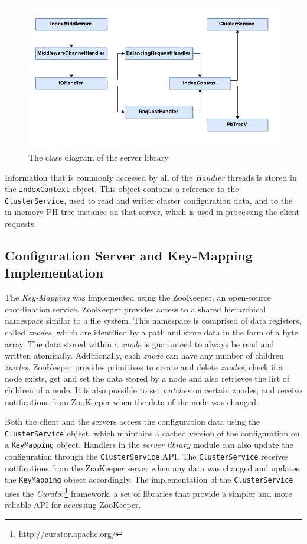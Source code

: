 \documentclass[11pt,a4paper]{globis-book}
\begin{document}
\begin{figure}[h]
    \centering 
    \includegraphics[scale=1]{images/Server}
    \caption{The class diagram of the server library}
    \label{fig:Server-library}
\end{figure}

Information that is commonly accessed by all of the \textit{Handler} threads is stored in the \texttt{IndexContext} object. This object contains a reference to the \texttt{ClusterService}, used to read and writer cluster configuration data, and to the in-memory PH-tree instance on that server, which is used in processing the client requests. 

\subsection{Configuration Server and Key-Mapping Implementation}

The \textit{Key-Mapping} was implemented using the ZooKeeper, an open-source coordination service. ZooKeeper provides access to a shared hierarchical namespace similar to a file system. This namespace is comprised of data registers, called \textit{znodes}, which are identified by a path and store data in the form of a byte array. The data stored within a \textit{znode} is guaranteed to always be read and written atomically. Additionally, each \textit{znode} can have any number of children \textit{znodes}. ZooKeeper provides primitives to create and delete \textit{znodes}, check if a node exists, get and set the data stored by a node and also retrieves the list of children of a node. It is also possible to set \textit{watches} on certain znodes, and receive notifications from ZooKeeper when the data of the node was changed. 

Both the client and the servers access the configuration data using the \texttt{ClusterService} object, which maintains a cached version of the configuration on a \texttt{KeyMapping} object. Handlers in the \textit{server library} module can also update the configuration through the \texttt{ClusterService} API. The \texttt{ClusterService} receives notifications from the ZooKeeper server when any data was changed and updates the \texttt{KeyMapping} object accordingly. The implementation of the \texttt{ClusterService} uses the \textit{Curator}\footnote{http://curator.apache.org/} framework, a set of libraries that provide a simpler and more reliable API for accessing ZooKeeper. 
\end{document}

